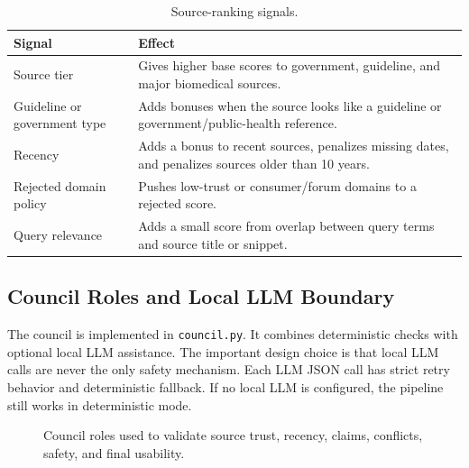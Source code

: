 \begin{table}[htbp]
\centering
\caption{Source-ranking signals.}
\label{tab:source_ranking_signals}
\begin{tabular}{p{} p{}}
\toprule
\textbf{Signal} & \textbf{Effect}\\
\midrule
Source tier & Gives higher base scores to government, guideline, and major biomedical sources.\\
Guideline or government type & Adds bonuses when the source looks like a guideline or government/public-health reference.\\
Recency & Adds a bonus to recent sources, penalizes missing dates, and penalizes sources older than 10 years.\\
Rejected domain policy & Pushes low-trust or consumer/forum domains to a rejected score.\\
Query relevance & Adds a small score from overlap between query terms and source title or snippet.\\
\bottomrule
\end{tabular}
\end{table}

\subsection{Council Roles and Local LLM Boundary}

The council is implemented in \texttt{council.py}. It combines deterministic checks with optional local LLM assistance. The important design choice is that local LLM calls are never the only safety mechanism. Each LLM JSON call has strict retry behavior and deterministic fallback. If no local LLM is configured, the pipeline still works in deterministic mode.

\begin{figure}[htbp]
\centering
{}
\caption{Council roles used to validate source trust, recency, claims, conflicts, safety, and final usability.}
\label{fig:web_council_roles}
\end{figure}

